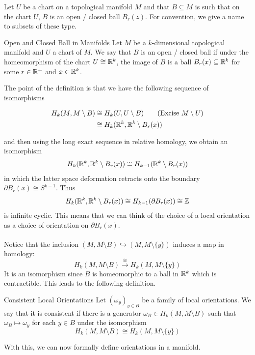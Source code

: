 \documentclass[a4paper]{article}
\begin{document}
Let $U$ be a chart on a topological manifold $M$ and that $B\subseteq M$ is such that on the chart $U$, $B$ is an open / closed ball $B_r(z)$. For convention, we give a name to subsets of these type. 

\begin{defn}{Open and Closed Ball in Manifolds}{} Let $M$ be a $k$-dimensional topological manifold and $U$ a chart of $M$. We say that $B$ is an open / closed ball if under the homeomorphism of the chart $U\cong\mathbb{R}^k$, the image of $B$ is a ball $B_r(x)\subseteq\mathbb{R}^k$ for some $r\in\mathbb{R}^+$ and $x\in\mathbb{R}^k$. 
\end{defn}

The point of the definition is that we have the following sequence of isomorphisms 

\begin{align*}
H_k(M,M\setminus B)&\cong H_k(U,U\setminus B)\tag{Excise $M\setminus U$}\\
&\cong H_k(\mathbb{R}^k,\mathbb{R}^k\setminus B_r(x))
\end{align*}

and then using the long exact sequence in relative homology, we obtain an isomorphism $$H_k(\mathbb{R}^k,\mathbb{R}^k\setminus B_r(x))\cong H_{k-1}(\mathbb{R}^k\setminus B_r(x))$$ in which the latter space deformation retracts onto the boundary $\partial B_r(x)\cong S^{k-1}$. Thus $$H_k(\mathbb{R}^k,\mathbb{R}^k\setminus B_r(x))\cong H_{k-1}(\partial B_r(x))\cong\mathbb{Z}$$ is infinite cyclic. This means that we can think of the choice of a local orientation as a choice of orientation on $\partial B_r(x)$. \\~\\

Notice that the inclusion $(M,M\setminus B)\hookrightarrow(M,M\setminus\{y\})$ induces a map in homology: $$H_k(M,M\setminus B)\overset{\cong}{\rightarrow}H_k(M,M\setminus\{y\})$$ It is an isomorphism since $B$ is homeomorphic to a ball in $\mathbb{R}^k$ which is contractible. This leads to the following definition. 

\begin{defn}{Consistent Local Orientations}{} Let $(\omega_y)_{y\in B}$ be a family of local orientations. We say that it is consistent if there is a generator $\omega_B\in H_k(M,M\setminus B)$ such that $\omega_B\mapsto\omega_y$ for each $y\in B$ under the isomorphism $$H_k(M,M\setminus B)\cong H_k(M,M\setminus\{y\})$$
\end{defn}

With this, we can now formally define orientations in a manifold. 
\end{document}
